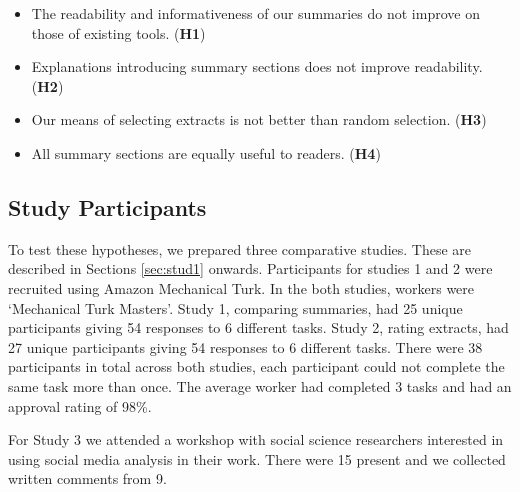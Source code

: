     \begin{itemize}
      \item{The readability and informativeness of our summaries do not improve on those of existing tools. (\textbf{H1})}
      \item{Explanations introducing summary sections does not improve readability. (\textbf{H2})}
      \item{Our means of selecting extracts is not better than random selection. (\textbf{H3})}
      \item{All summary sections are equally useful to readers. (\textbf{H4})}
    \end{itemize}

    \tocless\subsection{Study Participants}
      To test these hypotheses, we prepared three comparative studies. These are described in Sections \ref{sec:stud1} onwards. Participants for studies 1 and 2 were recruited using Amazon Mechanical Turk. In the both studies, workers were `Mechanical Turk Masters'. Study 1, comparing summaries, had 25 unique participants giving 54 responses to 6 different tasks. Study 2, rating extracts, had 27 unique participants giving 54 responses to 6 different tasks. There were 38 participants in total across both studies, each participant could not complete the same task more than once. The average worker had completed 3 tasks and had an approval rating of 98\%.

      For Study 3 we attended a workshop with social science researchers interested in using social media analysis in their work. There were 15 present and we collected written comments from 9.

